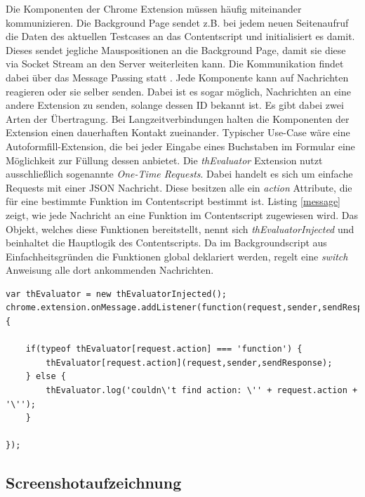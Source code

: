 Die Komponenten der Chrome Extension müssen häufig miteinander kommunizieren. Die Background Page sendet z.B. bei jedem neuen Seitenaufruf die Daten des aktuellen Testcases an das Contentscript und initialisiert es damit. Dieses sendet jegliche Mauspositionen an die Background Page, damit sie diese via Socket Stream an den Server weiterleiten kann. Die Kommunikation findet dabei über das Message Passing statt \cite{messagePassing}. Jede Komponente kann auf Nachrichten reagieren oder sie selber senden. Dabei ist es sogar möglich, Nachrichten an eine andere Extension zu senden, solange dessen ID bekannt ist. Es gibt dabei zwei Arten der Übertragung. Bei Langzeitverbindungen halten die Komponenten der Extension einen dauerhaften Kontakt zueinander. Typischer Use-Case wäre eine Autoformfill-Extension, die bei jeder Eingabe eines Buchstaben im Formular eine Möglichkeit zur Füllung dessen anbietet. Die \textit{thEvaluator} Extension nutzt ausschließlich sogenannte \textit{One-Time Requests}. Dabei handelt es sich um einfache Requests mit einer JSON Nachricht. Diese besitzen alle ein \textit{action} Attribute, die für eine bestimmte Funktion im Contentscript bestimmt ist. Listing \ref{message} zeigt, wie jede Nachricht an eine Funktion im Contentscript zugewiesen wird. Das Objekt, welches diese Funktionen bereitstellt, nennt sich \textit{thEvaluatorInjected} und beinhaltet die Hauptlogik des Contentscripts. Da im Backgroundscript aus Einfachheitsgründen die Funktionen global deklariert werden, regelt eine \textit{switch} Anweisung alle dort ankommenden Nachrichten.
\\
\begin{lstlisting}[caption=Message Handeling im Contentscript,label=message]
var thEvaluator = new thEvaluatorInjected();
chrome.extension.onMessage.addListener(function(request,sender,sendResponse){

    if(typeof thEvaluator[request.action] === 'function') {
        thEvaluator[request.action](request,sender,sendResponse);
    } else {
        thEvaluator.log('couldn\'t find action: \'' + request.action + '\'');
    }

});
\end{lstlisting}

\subsection{Screenshotaufzeichnung}


